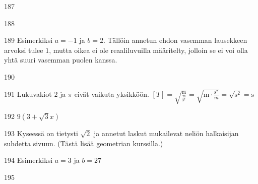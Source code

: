 \begin{Vastaus}{187}
	
\end{Vastaus}
\begin{Vastaus}{188}
	
\end{Vastaus}
\begin{Vastaus}{189}
Esimerkiksi $a=-1$ ja $b=2$. Tällöin annetun ehdon vasemman lausekkeen arvoksi tulee $1$, mutta oikea ei ole reaaliluvuilla määritelty, jolloin se ei voi olla yhtä suuri vasemman puolen kanssa.
	
\end{Vastaus}
\begin{Vastaus}{190}
	
\end{Vastaus}
\begin{Vastaus}{191}
	Lukuvakiot $2$ ja $\pi$ eivät vaikuta yksikköön. $[T]=\sqrt{\frac{\text{m}}{\frac{\text{m}}{\text{s}^2}}}=\sqrt{\text{m}\cdot \frac{\text{s}^2}{m}}=\sqrt{\text{s}^2}=\text{s}$
	
\end{Vastaus}
\begin{Vastaus}{192}
$9(3 + \sqrt{3}x)$
	
\end{Vastaus}
\begin{Vastaus}{193}
Kyseessä on tietysti $\sqrt{2}$ ja annetut laskut mukailevat neliön halkaisijan suhdetta sivuun. (Tästä lisää geometrian kurssilla.)
	
\end{Vastaus}
\begin{Vastaus}{194}
Esimerkiksi $a=3$ ja $b=27$
	
\end{Vastaus}
\begin{Vastaus}{195}
	
\end{Vastaus}
